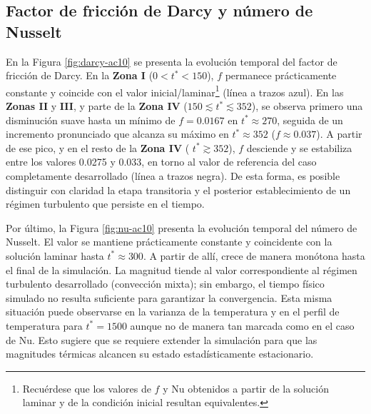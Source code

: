 \subsection{Factor de fricción de Darcy y número de Nusselt}
En la Figura \ref{fig:darcy-ac10} se presenta la evolución temporal del factor de fricción de Darcy. En la \textbf{Zona I} ($0 < t^* < 150$), $f$ permanece prácticamente constante y coincide con el \linebreak valor inicial/laminar\footnote{Recuérdese que los valores de $f$ y Nu obtenidos a partir de la solución laminar y de la condición inicial resultan equivalentes.} (línea a trazos azul). En las \textbf{Zonas II} y \textbf{III}, y parte de la \textbf{Zona IV} ($150 \lesssim t^* \lesssim 352 $), se observa primero una disminución suave hasta un mínimo de $f=0\text{.}0167$ en $t^*\approx270$, seguida de un incremento pronunciado que alcanza su máximo en $t^*\approx352$ ($f \approx 0\text{.}037$). A partir de ese pico, y en el resto de la \textbf{Zona IV} ( $t^*\gtrsim352$), $f$ desciende y se estabiliza entre los valores 0.0275 y 0.033, en torno al valor de referencia del caso completamente desarrollado (línea a trazos negra). De esta forma, es posible distinguir con claridad la etapa transitoria y el posterior establecimiento de un régimen turbulento que persiste en el tiempo.

Por último, la Figura \ref{fig:nu-ac10} presenta la evolución temporal del número de Nusselt. El valor se mantiene prácticamente constante y coincidente con la solución laminar hasta $t^* \approx 300$. A partir de allí, crece de manera monótona hasta el final de la simulación. La magnitud tiende al valor correspondiente al régimen turbulento desarrollado (convección mixta); sin embargo, el tiempo físico simulado no resulta suficiente para garantizar la convergencia. Esta misma situación puede observarse en la varianza de la temperatura y en el perfil de temperatura para $t^*=1500$ aunque no de manera tan marcada como en el caso de Nu. Esto sugiere que se requiere extender la simulación para que las magnitudes térmicas alcancen su estado estadísticamente estacionario.

